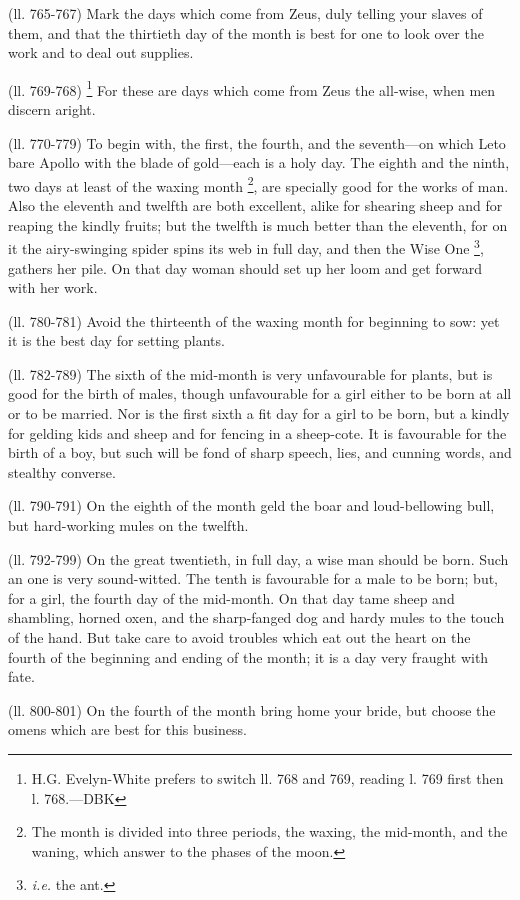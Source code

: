 (ll. 765-767) Mark the days which come from Zeus, duly telling your slaves of
them, and that the thirtieth day of the month is best for one to look over the
work and to deal out supplies.

(ll. 769-768) \footnote{H.G. Evelyn-White prefers
to switch ll. 768 and 769, reading l. 769 first then l. 768.—DBK} For these are days which come
from Zeus the all-wise, when men discern aright.

(ll. 770-779) To begin with, the first, the fourth, and the seventh—on
which Leto bare Apollo with the blade of gold—each is a holy day. The
eighth and the ninth, two days at least of the waxing month \footnote{The month is divided into
three periods, the waxing, the mid-month, and the waning, which answer to the
phases of the moon.}, are specially good for the works
of man. Also the eleventh and twelfth are both excellent, alike for shearing
sheep and for reaping the kindly fruits; but the twelfth is much better than
the eleventh, for on it the airy-swinging spider spins its web in full day, and
then the Wise One \footnote{\emph{i.e.} the ant.}, gathers her pile. On that day
woman should set up her loom and get forward with her work.

(ll. 780-781) Avoid the thirteenth of the waxing month for beginning to sow:
yet it is the best day for setting plants.

(ll. 782-789) The sixth of the mid-month is very unfavourable for plants, but
is good for the birth of males, though unfavourable for a girl either to be
born at all or to be married. Nor is the first sixth a fit day for a girl to be
born, but a kindly for gelding kids and sheep and for fencing in a sheep-cote.
It is favourable for the birth of a boy, but such will be fond of sharp speech,
lies, and cunning words, and stealthy converse.

(ll. 790-791) On the eighth of the month geld the boar and loud-bellowing bull,
but hard-working mules on the twelfth.

(ll. 792-799) On the great twentieth, in full day, a wise man should be born.
Such an one is very sound-witted. The tenth is favourable for a male to be
born; but, for a girl, the fourth day of the mid-month. On that day tame sheep
and shambling, horned oxen, and the sharp-fanged dog and hardy mules to the
touch of the hand. But take care to avoid troubles which eat out the heart on
the fourth of the beginning and ending of the month; it is a day very fraught
with fate.

(ll. 800-801) On the fourth of the month bring home your bride, but choose the
omens which are best for this business.

